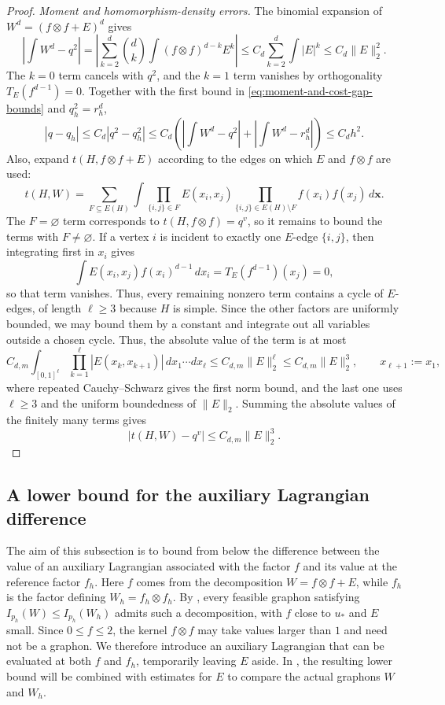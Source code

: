 \begin{proof}
\medskip
\noindent\emph{Moment and homomorphism-density errors.}
The binomial expansion of $W^d=(f\otimes f+E)^d$ gives
\begin{equation*}
  \left| \int W^d-q^2 \right|
  = \left| \sum_{k=2}^d\binom dk\int(f\otimes f)^{d-k}E^k \right|
  \le C_d\sum_{k=2}^d\int|E|^k \le C_d\|E\|_2^2.
\end{equation*}
The $k=0$ term cancels with $q^2$, and the $k=1$ term vanishes by orthogonality $T_E(f^{d-1})=0$.
Together with the first bound in \eqref{eq:moment-and-cost-gap-bounds} and $q_h^2=r_h^d$,
\[
  |q-q_h| \le C_d\left|q^2-q_h^2\right|
  \le C_d \left( \left| \int W^d-q^2 \right| + \left| \int W^d - r_h^d \right| \right)
  \le C_dh^2.
\]
Also, expand $t(H,f\otimes f+E)$ according to the edges on which $E$ and $f\otimes f$ are used:
\[
  t(H,W)=\sum_{F\subseteq E(H)}\int
  \prod_{\{i,j\}\in F}E(x_i,x_j)
  \prod_{\{i,j\}\in E(H)\setminus F}f(x_i)f(x_j)\,d\mathbf x.
\]
The $F=\varnothing$ term corresponds to $t(H,f\otimes f)=q^v$, so it remains to bound
the terms with $F\ne\varnothing$.
If a vertex $i$ is incident to exactly one $E$-edge $\{i,j\}$, then integrating
first in $x_i$ gives
\[
  \int E(x_i,x_j)f(x_i)^{d-1}\,dx_i
  =T_E(f^{d-1})(x_j)=0,
\]
so that term vanishes.  Thus, every remaining nonzero term contains a cycle of
$E$-edges, of length $\ell\ge3$ because $H$ is simple.  Since the other
factors are uniformly bounded, we may bound them by a constant and integrate
out all variables outside a chosen cycle.  Thus, the absolute value of the term
is at most
\[
  C_{d,m}\int_{[0,1]^\ell}\prod_{k=1}^\ell|E(x_k,x_{k+1})|\,dx_1\cdots dx_\ell
  \le C_{d,m}\|E\|_2^\ell\le C_{d,m}\|E\|_2^3,
  \qquad x_{\ell+1}:=x_1,
\]
where repeated Cauchy--Schwarz gives the first norm bound, and the last one
uses $\ell\ge3$ and the uniform boundedness of $\|E\|_2$.  Summing the
absolute values of the finitely many terms gives
\begin{equation*}
  |t(H,W)-q^v|\le C_{d,m}\|E\|_2^3.
\end{equation*}
\end{proof}

\subsection{A lower bound for the auxiliary Lagrangian difference}
\label{sec:auxiliary-lagrangian}

The aim of this subsection is to bound from below the difference between the
value of an auxiliary Lagrangian associated with the factor $f$ and its value
at the reference factor $f_h$.  Here $f$ comes from the
decomposition $W=f\otimes f+E$, while $f_h$ is the factor defining
$W_h=f_h\otimes f_h$.  By , every
feasible graphon satisfying $I_{p_h}(W)\le I_{p_h}(W_h)$ admits such a
decomposition, with $f$ close to $u_*$ and $E$ small.  Since $0\le f\le2$,
the kernel $f\otimes f$ may take values larger than $1$ and need not be a
graphon.  We therefore introduce an auxiliary Lagrangian that can be evaluated
at both $f$ and $f_h$, temporarily leaving $E$ aside.  In
, the resulting lower bound will be
combined with estimates for $E$ to compare the actual graphons $W$ and $W_h$.

